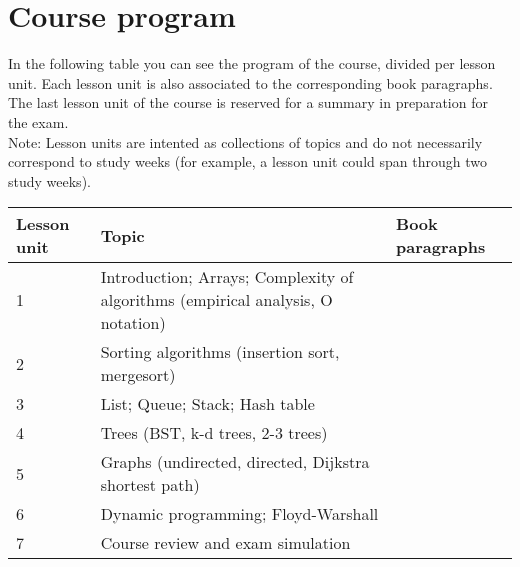 \section{Course program}
	
	In the following table you can see the program of the course, divided per lesson unit. Each lesson unit is also associated to the corresponding book paragraphs. The last lesson unit of the course is reserved for a summary in preparation for the exam. \\
	Note: Lesson units are intented as collections of topics and do not necessarily correspond to study weeks (for example, a lesson unit could span through two study weeks).
	
	\begin{tabular}{ | p{1.2cm} | p{10cm} | p{3.7cm} | }
		\hline
	  	\textbf{Lesson unit} & \textbf{Topic} & \textbf{Book paragraphs} \\
	  	\hline
  		1 & Introduction; Arrays; Complexity of algorithms (empirical analysis, O notation) &  \\
  		\hline
  		2 & Sorting algorithms (insertion sort, mergesort) &  \\
  		\hline
  		3 & List; Queue; Stack; Hash table &  \\
  		\hline
  		4 & Trees (BST, k-d trees, 2-3 trees) &  \\
  		\hline
  		5 & Graphs (undirected, directed, Dijkstra shortest path) &  \\
  		\hline
  		6 & Dynamic programming; Floyd-Warshall & \\
  		\hline
  		7 & Course review and exam simulation & \\
  		\hline
	\end{tabular}
\begin{comment}
  		4 & Binary search trees & 3.2 \\
  		\hline
  		5 & Balanced search trees: 2-3 search trees & 3.3 \\
  		\hline
  		6 & Graphs (undirected; directed; Dijkstra shortest path) & 4.1, 4.2, 4.4 \\
  		\hline
  		7 & Dynamic programming; Floyd-Warshall & Not covered by the book, see slides or Cormen\\
  		\hline
  		8 & Course recap & \\
  		\hline
\end{comment}
